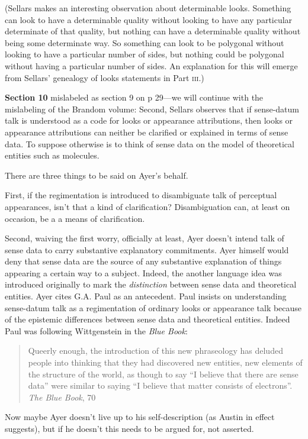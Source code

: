 \documentclass[11pt]{article}
\begin{document}
(Sellars makes an interesting observation about determinable looks. Something can look to have a determinable quality without looking to have any particular determinate of that quality, but nothing can have a determinable quality without being some determinate way. So something can look to be polygonal without looking to have a particular number of sides, but nothing could be polygonal without having a particular number of sides. An explanation for this will emerge from Sellars' genealogy of looks statements in Part \textsc{iii}.)

\textbf{Section 10} mislabeled as section 9  on p 29---we will continue with the mislabeling of the Brandom volume: Second, Sellars observes that if sense-datum talk is understood as a code for looks or appearance attributions, then looks or appearance attributions can neither be clarified or explained in terms of sense data. To suppose otherwise is to think of sense data on the model of theoretical entities such as molecules.

There are three things to be said on Ayer's behalf.

First, if the regimentation is introduced to disambiguate talk of perceptual appearances, isn't that a kind of clarification? Disambiguation can, at least on occasion, be a a means of clarification.

Second, waiving the first worry, officially at least, Ayer doesn't intend talk of sense data to carry substantive explanatory commitments. Ayer himself would deny that sense data are the source of any substantive explanation of things appearing a certain way to a subject. Indeed, the another language idea was introduced originally to mark the \emph{distinction} between sense data and theoretical entities. Ayer cites G.A. Paul as an antecedent. Paul insists on understanding sense-datum talk as a regimentation of ordinary looks or appearance talk because of the epistemic differences between sense data and theoretical entities. Indeed Paul was following Wittgenstein in the \emph{Blue Book}:
\begin{quote}
	Queerly enough, the introduction of this new phraseology has deluded people into thinking that they had discovered new entities, new elements of the structure of the world, as though to say ``I believe that there are sense data'' were similar to saying ``I believe that matter consists of electrons''. \emph{The Blue Book}, 70
\end{quote}
Now maybe Ayer doesn't live up to his self-description (as Austin in effect suggests), but if he doesn't this needs to be argued for, not asserted.
\end{document}
